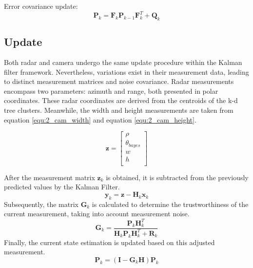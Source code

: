 Error covariance update:
\begin{equation}\label{equ:error_covariance}
    \mathbf{P}_k=\mathbf{F}_k \mathbf{P}_{k-1} \mathbf{F}_k^T+\mathbf{Q}_k
\end{equation}

\subsection{Update}\label{equ:2_update}

Both radar and camera undergo the same update procedure within the Kalman filter framework. 
Nevertheless, variations exist in their measurement data, 
leading to distinct measurement matrices and noise covariance. 
Radar measurements encompass two parameters: azimuth and range, 
both presented in polar coordinates. 
These radar coordinates are derived from the centroids of the k-d tree clusters.
Meanwhile, the width and height measurements are taken from equation \ref{equ:2_cam_width} and equation \ref{equ:2_cam_height}.

\begin{equation}
    \mathbf{z}=
    \begin{bmatrix}
        \rho \\ 
        \theta_{bayes}\\
        w \\
        h \\
    \end{bmatrix}
\end{equation}


After the measurement matrix $\mathbf{z}_k$ is obtained, 
it is subtracted from the previously predicted values by the Kalman Filter. 
\begin{equation}
    \mathbf{y}_{k}=\mathbf{z}-\mathbf{H}_k \mathbf{x}_k
\end{equation}
Subsequently, the matrix $ \mathbf{G}_k $ is calculated to determine the trustworthiness of the current measurement, taking into account measurement noise. 
\begin{equation}
    \mathbf{G}_k = \frac{\mathbf{P}_k \mathbf{H}_k^T}{\mathbf{H}_k\mathbf{P}_k\mathbf{H}_k^T + \mathbf{R}_k}
\end{equation}
Finally, the current state estimation is updated based on this adjusted measurement.
\begin{equation}
    \mathbf{P}_k = (\mathbf{I} - \mathbf{G}_k\mathbf{H})\mathbf{P}_k
\end{equation}


